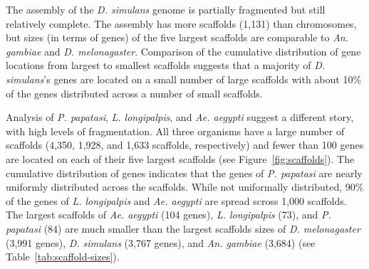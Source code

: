 The assembly of the \emph{D. simulans} genome is partially fragmented but still relatively complete.  The assembly has more scaffolds (1,131) than chromosomes, but sizes (in terms of genes) of the five largest scaffolds are comparable to \emph{An. gambiae} and \emph{D. melonagaster}.  Comparison of the cumulative distribution of gene locations from largest to smallest scaffolds suggests that a majority of \emph{D. simulans}'s genes are located on a small number of large scaffolds with about 10\% of the genes distributed across a number of small scaffolds.

Analysis of \emph{P. papatasi}, \emph{L. longipalpis}, and \emph{Ae. aegypti} suggest a different story, with high levels of fragmentation.  All three organisms have a large number of scaffolds (4,350, 1,928, and 1,633 scaffolds, respectively) and fewer than 100 genes are located on each of their five largest scaffolds (see Figure~\ref{fig:scaffolds}).  The cumulative distribution of genes indicates that the genes of \emph{P. papatasi} are nearly uniformly distributed across the scaffolds.  While not uniformally distributed, 90\% of the genes of \emph{L. longipalpis} and \emph{Ae. aegypti} are spread scross 1,000 scaffolds. The largest scaffolds of \emph{Ae. aegypti} (104 genes), \emph{L. longipalpis} (73), and \emph{P. papatasi} (84) are much smaller than the largest scaffolds sizes of \emph{D. melonagaster} (3,991 genes), \emph{D. simulans} (3,767 genes), and \emph{An. gambiae} (3,684) (see Table~\ref{tab:scaffold-sizes}).

